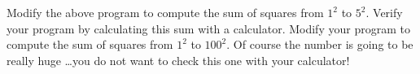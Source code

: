 Modify the above program to compute the sum of squares from $1^{2}$ to $5^{2}$. Verify your program by calculating this sum with a calculator. Modify your program to compute the sum of squares from $1^{2}$ to $100^{2}$. Of course the number is going to be really huge \ldots you do not want to check this one with your calculator!

